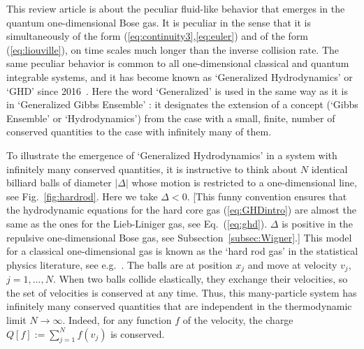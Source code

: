 \documentclass[onecolumn,amsfonts,showpacs,superscriptaddress]{revtex4-1}
\begin{document}
\vspace{0.5cm}


This review article is about the peculiar fluid-like behavior that emerges in the quantum one-dimensional Bose gas. It is peculiar in the sense that it is simultaneously of the form (\ref{eq:continuity3},\ref{eq:euler}) and of the form (\ref{eq:liouville}), on time scales much longer than the inverse collision rate. The same peculiar behavior is common to all one-dimensional classical and quantum integrable systems, and it has become known as `Generalized Hydrodynamics' or `GHD' since 2016~\citep{castro2016emergent,bertini2016transport}. Here the word `Generalized' is used in the same way as it is in `Generalized Gibbs Ensemble' \citep{rigol2007relaxation,rigol2008thermalization}: it designates the extension of a concept (`Gibbs Ensemble' or `Hydrodynamics') from the case with a small, finite, number of conserved quantities to the case with infinitely many of them.


\vspace{0.5cm}

To illustrate the emergence of `Generalized Hydrodynamics' in a system with infinitely many conserved quantities, it is instructive to think about $N$ identical billiard balls of diameter $| \Delta|$ whose motion is restricted to a one-dimensional line, see Fig.~\ref{fig:hardrod}. Here we take $\Delta < 0$. [This funny convention ensures that the hydrodynamic equations for the hard core gas (\ref{eq:GHDintro}) are almost the same as the ones for the Lieb-Liniger gas, see Eq.~(\ref{eq:ghd}). $\Delta$ is positive in the repulsive one-dimensional Bose gas, see Subsection~\ref{subsec:Wigner}.] This model for a classical one-dimensional gas is known as the `hard rod gas' in the statistical physics literature, see e.g.~\citep{percus1976equilibrium,lebowitz1967kinetic,aizenman1975ergodic,boldrighini1983one,spohn2012large,boldrighini1997one,doyon2017dynamics,cao2018incomplete}. The balls are at position $x_j$ and move at velocity $v_j$, $j=1,\dots , N$. When two balls collide elastically, they exchange their velocities, so the set of velocities is conserved at any time. Thus, this many-particle system has infinitely many conserved quantities that are independent in the thermodynamic limit $N\rightarrow \infty$. Indeed, for any function $f$ of the velocity, the charge $Q[f] := \sum_{j=1}^N f(v_j)$ is conserved.
\end{document}
